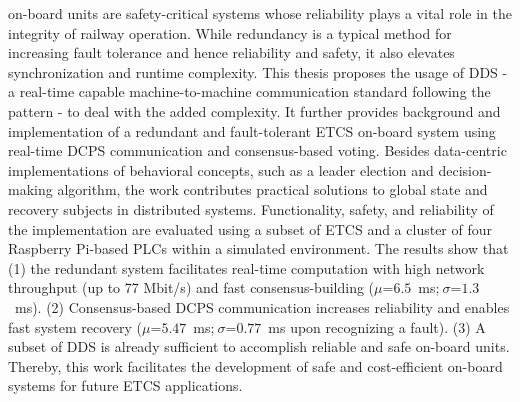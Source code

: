 
\null\vfil
\begin{center}\textsf{\textbf{\abstractname}}\end{center}
%
\noindent {} on-board units are safety-critical systems whose reliability plays a vital role in the integrity of railway operation.
While redundancy is a typical method for increasing fault tolerance and hence reliability and safety, it also elevates synchronization and runtime complexity.
This thesis proposes the usage of DDS - a real-time capable machine-to-machine communication standard following the  pattern - to deal with the added complexity.
It further provides background and implementation of a redundant and fault-tolerant ETCS on-board system using real-time DCPS communication and consensus-based voting.
Besides data-centric implementations of behavioral concepts, such as a leader election and decision-making algorithm, the work contributes practical solutions to global state and recovery subjects in distributed systems.
Functionality, safety, and reliability of the implementation are evaluated using a subset of ETCS and a cluster of four Raspberry Pi-based PLCs within a simulated environment.
The results show that (1) the redundant system facilitates real-time computation with high network throughput (up to 77 Mbit/s) and fast consensus-building ($\mu$=$6.5$~ms;$~\sigma$=$1.3$~ms). (2) Consensus-based DCPS communication increases reliability and enables fast system recovery ($\mu$=$5.47$~ms;$~\sigma$=$0.77$~ms upon recognizing a fault).
(3) A subset of DDS is already sufficient to accomplish reliable and safe  on-board units.
Thereby, this work facilitates the development of safe and cost-efficient on-board systems for future ETCS applications.

\vfil\null
\clearpage

